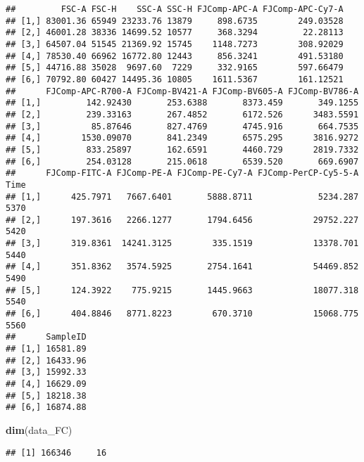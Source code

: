 \documentclass[
]{article}
\newenvironment{Shaded}{\begin{snugshade}}{\end{snugshade}}
\newcommand{\FunctionTok}[1]{\textcolor[rgb]{0.13,0.29,0.53}{\textbf{#1}}}
\newcommand{\NormalTok}[1]{#1}
\begin{document}
\begin{verbatim}
##         FSC-A FSC-H    SSC-A SSC-H FJComp-APC-A FJComp-APC-Cy7-A
## [1,] 83001.36 65949 23233.76 13879     898.6735        249.03528
## [2,] 46001.28 38336 14699.52 10577     368.3294         22.28113
## [3,] 64507.04 51545 21369.92 15745    1148.7273        308.92029
## [4,] 78530.40 66962 16772.80 12443     856.3241        491.53180
## [5,] 44716.88 35028  9697.60  7229     332.9165        597.66479
## [6,] 70792.80 60427 14495.36 10805    1611.5367        161.12521
##      FJComp-APC-R700-A FJComp-BV421-A FJComp-BV605-A FJComp-BV786-A
## [1,]         142.92430       253.6388       8373.459       349.1255
## [2,]         239.33163       267.4852       6172.526      3483.5591
## [3,]          85.87646       827.4769       4745.916       664.7535
## [4,]        1530.09070       841.2349       6575.295      3816.9272
## [5,]         833.25897       162.6591       4460.729      2819.7332
## [6,]         254.03128       215.0618       6539.520       669.6907
##      FJComp-FITC-A FJComp-PE-A FJComp-PE-Cy7-A FJComp-PerCP-Cy5-5-A Time
## [1,]      425.7971   7667.6401       5888.8711             5234.287 5370
## [2,]      197.3616   2266.1277       1794.6456            29752.227 5420
## [3,]      319.8361  14241.3125        335.1519            13378.701 5440
## [4,]      351.8362   3574.5925       2754.1641            54469.852 5490
## [5,]      124.3922    775.9215       1445.9663            18077.318 5540
## [6,]      404.8846   8771.8223        670.3710            15068.775 5560
##      SampleID
## [1,] 16581.89
## [2,] 16433.96
## [3,] 15992.33
## [4,] 16629.09
## [5,] 18218.38
## [6,] 16874.88
\end{verbatim}

\begin{Shaded}
\begin{Highlighting}[]
\FunctionTok{dim}\NormalTok{(data\_FC)}
\end{Highlighting}
\end{Shaded}

\begin{verbatim}
## [1] 166346     16
\end{verbatim}
\end{document}
